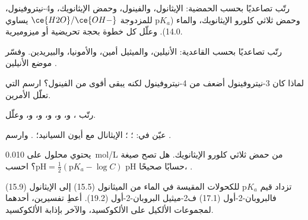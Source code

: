 \begin{exercise}[$\star\star$]\label{exo:b1:electronic-effects:5}
رتّب تصاعديًا بحسب الحمضية: الإيثانول، والفينول، وحمض الإيثانويك،
و4-نيتروفينول، وحمض ثلاثي كلورو الإيثانويك، والماء ($\mathrm{p}K_a$
للمزدوجة $\ce{H2O}/\ce{OH-}$ يساوي 14.0). وعلّل كل خطوة بحجة تحريضية أو
ميزوميرية.
\end{exercise}

\begin{exercise}[$\star\star$]\label{exo:b1:electronic-effects:6}
رتّب تصاعديًا بحسب القاعدية: الأنيلين، والميثيل أمين، والأمونيا، والبيريدين.
وفسّر موضع الأنيلين .
\end{exercise}

\begin{exercise}[$\star\star$]\label{exo:b1:electronic-effects:7}
لماذا كان 3-نيتروفينول أضعف من 4-نيتروفينول لكنه يبقى أقوى من
الفينول؟ ارسم  التي تعلّل الأمرين.
\end{exercise}

\begin{exercise}[$\star\star$]\label{exo:b1:electronic-effects:8}
رتّب  ، و، و،
و، و، و، وعلّل.
\end{exercise}

\begin{exercise}[$\star\star$]\label{exo:b1:electronic-effects:9}
عيّن   في: ؛
؛ الإيثانال مع أيون السيانيد؛ . وارسم
.
\end{exercise}

\begin{exercise}[$\star\star\star$]\label{exo:b1:electronic-effects:10}
يحتوي محلول على \qty{0.010}{mol/L} من حمض ثلاثي كلورو الإيثانويك. هل
تصح صيغة  $\mathrm{pH} = \frac12(\mathrm{p}K_a - \log C)$؟
احسب pH حسابًا صحيحًا، .
\end{exercise}

\begin{exercise}[$\star\star\star$]\label{exo:b1:electronic-effects:11}
تزداد قيم $\mathrm{p}K_a$ للكحولات المقيسة في الماء من الميثانول
(15.5) إلى الإيثانول (15.9) فالبروبان-2-أول (17.1) ف2-ميثيل البروبان-2-أول
(19.2). أعطِ تفسيرين، أحدهما  لمجموعات
الألكيل على الألكوكسيد، والآخر بإذابة الألكوكسيد.
\end{exercise}

